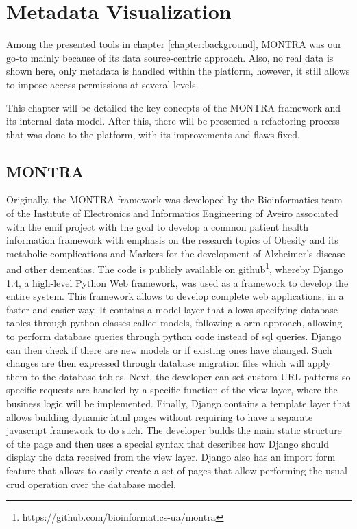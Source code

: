 \chapter{Metadata Visualization}
\graphicspath{{figs/03-visualization/}}
\label{chapter:metadata-visualization}

Among the presented tools in chapter \ref{chapter:background}, MONTRA was our go-to mainly because of its data source-centric approach.
Also, no real data is shown here, only metadata is handled within the platform, however, it still allows to impose access permissions at several levels.

This chapter will be detailed the key concepts of the MONTRA framework and its internal data model.
After this, there will be presented a refactoring process that was done to the platform, with its improvements and flaws fixed.

\section{MONTRA}


Originally, the MONTRA framework was developed by the Bioinformatics team of the Institute of Electronics and Informatics Engineering of Aveiro associated with the \gls{emif} project with the goal to develop a common patient health information framework with emphasis on the research topics of Obesity and its metabolic complications and Markers for the development of Alzheimer's disease and other dementias.
The code is publicly available on github\footnote{https://github.com/bioinformatics-ua/montra}, whereby Django 1.4, a high-level Python Web framework\cite{django}, was used as a framework to develop the entire system.
This framework allows to develop complete web applications, in a faster and easier way.
It contains a model layer that allows specifying database tables through python classes called models, following a \gls{orm} approach, allowing to perform database queries through python code instead of \gls{sql} queries.
Django can then check if there are new models or if existing ones have changed. Such changes are then expressed through database migration files which will apply them to the database tables.
Next, the developer can set custom URL patterns so specific requests are handled by a specific function of the view layer, where the business logic will be implemented.
Finally, Django contains a template layer that allows building dynamic \gls{html} pages without requiring to have a separate javascript framework to do such.
The developer builds the main static structure of the page and then uses a special syntax that describes how Django should display the data received from the view layer.
Django also has an import form feature that allows to easily create a set of pages that allow performing the usual \gls{crud} operation over the database model.

